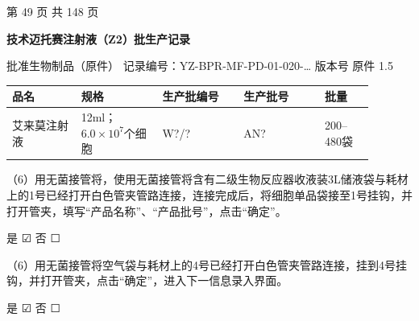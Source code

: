 \documentclass[UTF8,10pt,a4paper,fontset=fandol]{ctexart}
\newcommand{\fieldvalue}[1]{#1}
\newcommand{\handwritten}[1]{#1}
\newcommand{\checkboxfield}[1]{\ifstrequal{#1}{checked}{☑}{\ifstrequal{#1}{unclear}{?}{☐}}}
\begin{document}
\begin{center}
第 49 页 共 148 页
\end{center}

\newpage

\begin{center}
\textbf{技术迈托赛注射液（Z2）批生产记录}
\end{center}

\noindent
批准生物制品（原件）\quad
记录编号：YZ-BPR-MF-PD-01-020-\ldots
\hfill
版本号
\fieldvalue{原件}
\quad
\fieldvalue{1.5}

\begin{center}
\begin{tabular}{|p{0.17\linewidth}|p{0.20\linewidth}|p{0.20\linewidth}|p{0.20\linewidth}|p{0.12\linewidth}|}
\hline
品名 & 规格 & 生产批编号 & 生产批号 & 批量 \\ \hline
艾来莫注射液 &
12ml；$6.0\times10^{7}$个细胞 &
\fieldvalue{\handwritten{W?/?}} &
\fieldvalue{\handwritten{AN?}} &
\fieldvalue{200--480袋}
\\ \hline
\end{tabular}
\end{center}

\noindent
（6）用无菌接管将，使用无菌接管将含有二级生物反应器收液装3L储液袋与耗材上的1号已经打开白色管夹管路连接，连接完成后，将细胞单品袋接至1号挂钩，并打开管夹，填写“产品名称”、“产品批号”，点击“确定”。

\noindent
是
\fieldvalue{\handwritten{\checkboxfield{checked}}}
\quad
否
\fieldvalue{\checkboxfield{unchecked}}

\medskip

\noindent
（6）用无菌接管将空气袋与耗材上的4号已经打开白色管夹管路连接，挂到4号挂钩，并打开管夹，点击“确定”，进入下一信息录入界面。

\noindent
是
\fieldvalue{\handwritten{\checkboxfield{checked}}}
\quad
否
\fieldvalue{\checkboxfield{unchecked}}
\end{document}
